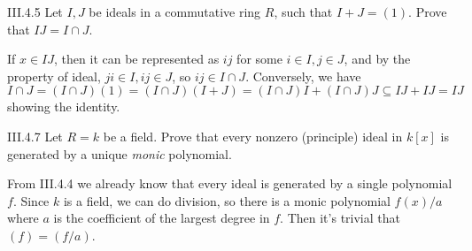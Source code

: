 \begin{problem}{III.4.5}
Let $I, J$ be ideals in a commutative ring $R$, such that $I+J = (1)$. Prove that $IJ = I \cap J$.
\end{problem}
\begin{pf}
If $x \in IJ$, then it can be represented as $ij$ for some $i \in I, j \in J$, and by the property of ideal, $ji \in I, ij \in J$, so $ij \in I \cap J$. Conversely, we have
\[
I \cap J = (I \cap J) (1) = (I\cap J)(I+J) = (I \cap J)I + (I \cap J)J \subseteq IJ + IJ = IJ 
\]
showing the identity.
\end{pf}

\begin{problem}{III.4.7}
Let $R = k$ be a field. Prove that every nonzero (principle) ideal in $k[x]$ is generated by a unique \emph{monic} polynomial.
\end{problem}
\begin{pf}
From III.4.4 we already know that every ideal is generated by a single polynomial $f$. Since $k$ is a field, we can do division, so there is a monic polynomial $f(x)/a$ where $a$ is the coefficient of the largest degree in $f$. Then it's trivial that $(f) = (f/a)$.
\end{pf}

